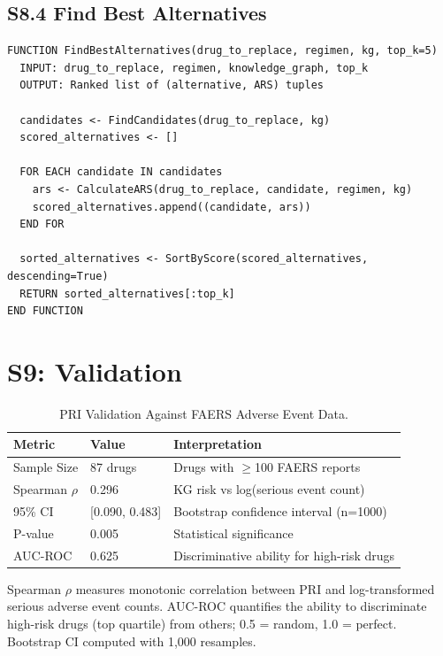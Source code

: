 \documentclass[12pt,a4paper]{article}
\begin{document}
\subsection{S8.4 Find Best Alternatives}

\begin{verbatim}
FUNCTION FindBestAlternatives(drug_to_replace, regimen, kg, top_k=5)
  INPUT: drug_to_replace, regimen, knowledge_graph, top_k
  OUTPUT: Ranked list of (alternative, ARS) tuples
  
  candidates <- FindCandidates(drug_to_replace, kg)
  scored_alternatives <- []
  
  FOR EACH candidate IN candidates
    ars <- CalculateARS(drug_to_replace, candidate, regimen, kg)
    scored_alternatives.append((candidate, ars))
  END FOR
  
  sorted_alternatives <- SortByScore(scored_alternatives, descending=True)
  RETURN sorted_alternatives[:top_k]
END FUNCTION
\end{verbatim}

\section{S9: Validation}
\label{sec:s9}

\begin{table}[H]
\centering
\caption{PRI Validation Against FAERS Adverse Event Data.}
\label{tab:pri_validation}
\begin{tabular}{@{}lll@{}}
\toprule
\textbf{Metric} & \textbf{Value} & \textbf{Interpretation} \\
\midrule
Sample Size & 87 drugs & Drugs with $\geq$100 FAERS reports \\
Spearman $\rho$ & 0.296 & KG risk vs log(serious event count) \\
95\% CI & [0.090, 0.483] & Bootstrap confidence interval (n=1000) \\
P-value & 0.005 & Statistical significance \\
AUC-ROC & 0.625 & Discriminative ability for high-risk drugs \\
\bottomrule
\end{tabular}
\end{table}

\noindent Spearman $\rho$ measures monotonic correlation between PRI and log-transformed serious adverse event counts. AUC-ROC quantifies the ability to discriminate high-risk drugs (top quartile) from others; 0.5 = random, 1.0 = perfect. Bootstrap CI computed with 1,000 resamples.
\end{document}
